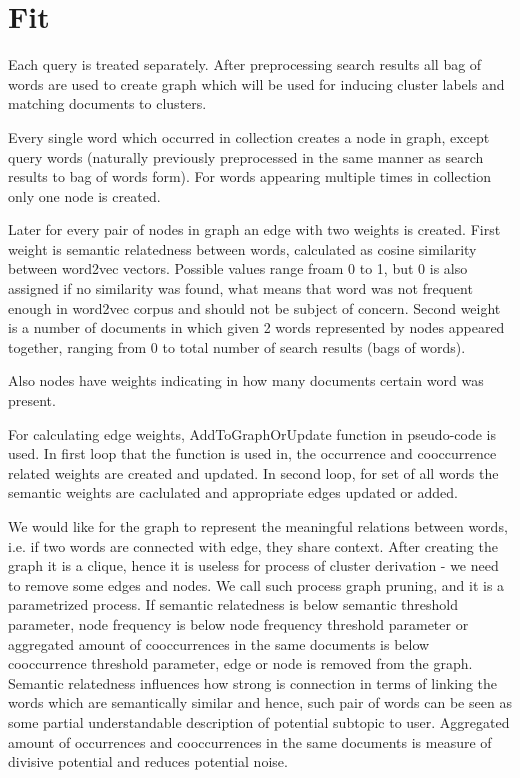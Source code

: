 \documentclass[a4paper, 12pt, oneside]{Thesis} %
\begin{document}
\section{Fit} Each query is treated separately. After preprocessing search results all bag of words are used to create graph which will be used for inducing cluster labels and matching documents to clusters. 

Every single word which occurred in collection creates a node in graph, except query words (naturally previously preprocessed in the same manner as search results to bag of words form). For words appearing multiple times in collection only one node is created.

Later for every pair of nodes in graph an edge with two weights is created. First weight is semantic relatedness between words, calculated as cosine similarity between word2vec vectors. Possible values range froam 0 to 1, but 0 is also assigned if no similarity was found, what means that word was not frequent enough in word2vec corpus and should not be subject of concern. Second weight is a number of documents in which given 2 words represented by nodes appeared together, ranging from 0 to total number of search results (bags of words).

Also nodes have weights indicating in how many documents certain word was present.

For calculating edge weights, AddToGraphOrUpdate function in pseudo-code is used. In first loop that the function is used in, the occurrence and cooccurrence related weights are created and updated. In second loop, for set of all words the semantic weights are caclulated and appropriate edges updated or added.

We would like for the graph to represent the meaningful relations between words, i.e. if two words are connected with edge, they share context. After creating the graph it is a clique, hence it is useless for process of cluster derivation - we need to remove some edges and nodes. We call such process graph pruning, and it is a parametrized process. If semantic relatedness is below semantic threshold parameter, node frequency is below node frequency threshold parameter or aggregated amount of cooccurrences in the same documents is below cooccurrence threshold parameter, edge or node is removed from the graph. Semantic relatedness influences how strong is connection in terms of linking the words which are semantically similar and hence, such pair of words can be seen as some partial understandable description of potential subtopic to user. Aggregated amount of occurrences and cooccurrences in the same documents is measure of divisive potential and reduces potential noise.
\end{document}
